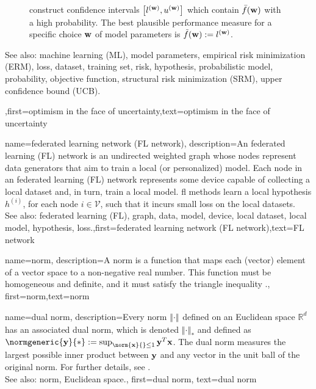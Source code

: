 {{\begin{figure}[H]
\begin{center}
{	construct confidence intervals $\big[ l^{({\bf w})},  u^{({\bf w})} \big]$ which contain $\bar{f}({\bf w})$  
	with a high probability. The best plausible performance measure for a specific choice ${\bf w}$ of model parameters 
	is $\tilde{f}({\bf w}) := l^{({\bf w})}$.} 
	\end{center}
		\end{figure}
		See also: machine learning (ML), model parameters, empirical risk minimization (ERM), loss, dataset, training set, risk, hypothesis, probabilistic model, probability, objective function, structural risk minimization (SRM), upper confidence bound (UCB).},first={optimism in the face of uncertainty},text={optimism in the face of uncertainty} 
}

{name={federated learning network (FL network)},
	description={An federated learning (FL) network is an 
		undirected weighted graph whose nodes represent data generators that 
		aim to train a local (or personalized) model. Each node in an federated learning (FL) network 
		represents some device capable of collecting a local dataset 
		and, in turn, train a local model. \Gls{fl} methods learn a local hypothesis $h^{(i)}$, for 
	    each node $i \in \mathcal{V}$, such that it incurs small loss on the local datasets.
	    			\\ 
		See also: federated learning (FL), graph, data, model, device, local dataset, local model, hypothesis, loss.},first={federated learning network (FL network)},text={FL network} 
}

{name={norm},
	description={A norm is a function that maps each (vector) element 
		of a vector space to a non-negative real number. This function must be 
		homogeneous and definite, and it must satisfy the triangle inequality \cite{HornMatAnalysis}.},
	first={norm},text={norm} 
}

{name={dual norm},
description={Every norm $\left\Vert  {\cdot} \right\Vert_{}$ defined on an Euclidean space $\mathbb{R}^{d}$ 
		has an associated dual norm, which is denoted $\left\Vert  {\cdot} \right\Vert_{*}$ and defined as 
		$\normgeneric{{\bf y}}{*} := \sup_{\norm{{\bf x}}{} \le 1} {\bf y}^{T} {\bf x}$. 
		The dual norm measures the largest possible inner product between ${\bf y}$ 
		and any vector in the unit ball of the original norm. For further details, see 
		\cite[Sec.~A.1.6]{BoydConvexBook}.
					\\ 
		See also: norm, Euclidean space.},
	first={dual norm},
	text={dual norm}
}

